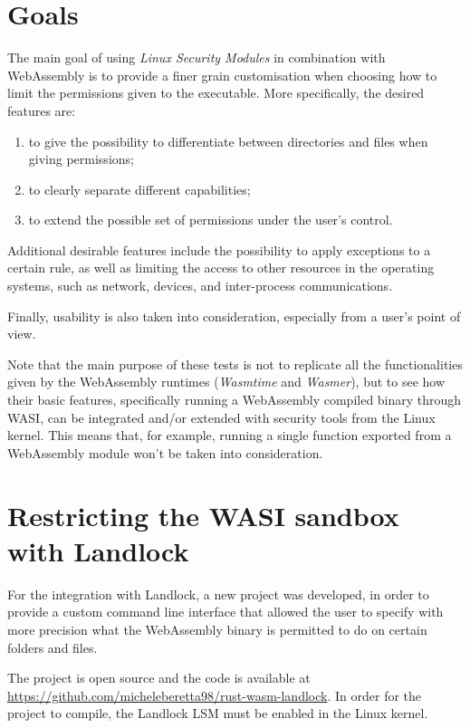 \section{Goals}

The main goal of using \textit{Linux Security Modules} in combination with WebAssembly
is to provide a finer grain customisation when choosing how to limit the permissions given
to the executable. More specifically, the desired features are:
\begin{enumerate}
  \item to give the possibility to differentiate between directories and files when giving permissions;
  \item to clearly separate different capabilities;
  \item to extend the possible set of permissions under the user's control.
\end{enumerate}

Additional desirable features include the possibility to apply exceptions to a certain rule, as well
as limiting the access to other resources in the operating systems, such as network, devices, and
inter-process communications.

Finally, usability is also taken into consideration, especially from a user's point of view.

Note that the main purpose of these tests is not to replicate all the functionalities given by
the WebAssembly runtimes (\textit{Wasmtime} and \textit{Wasmer}), but to see how their basic features,
specifically running a WebAssembly compiled binary through WASI, can be integrated and/or extended with
security tools from the Linux kernel.
This means that, for example, running a single function exported from a WebAssembly module won't be taken
into consideration.

\section{Restricting the WASI sandbox with Landlock}
\label{sec:restricting-wasi-landlock}

For the integration with Landlock, a new project was developed, in order to provide
a custom command line interface that allowed the user to specify with more precision what
the WebAssembly binary is permitted to do on certain folders and files.

The project is open source and the code is available at \url{https://github.com/micheleberetta98/rust-wasm-landlock}.
In order for the project to compile, the Landlock LSM must be enabled in the Linux kernel.

